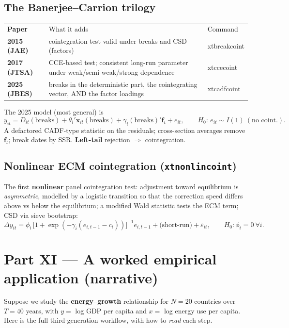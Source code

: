 \documentclass[11pt,a4paper]{article}
\newcommand{\Ito}{I(1)}
\newcommand{\cmd}[1]{\texttt{\textcolor{camber}{#1}}}
\newcommand{\hlt}[2]{\textcolor{#1}{\textbf{#2}}}
\newcommand{\bx}{\mathbf{x}}
\newcommand{\bff}{\mathbf{f}}
\theoremstyle{definition}
\begin{document}
\subsection{The Banerjee--Carrion trilogy}
\begin{center}
\begin{tabular}{@{}>{\bfseries}l p{9.2cm} >{\ttfamily}l@{}}
\rowcolor{cteal}\color{white}Paper & \color{white}What it adds & \color{white}Command\\
2015 (JAE) & cointegration test valid under breaks and CSD (factors) & xtbreakcoint\\
2017 (JTSA) & CCE-based test; consistent long-run parameter under weak/semi-weak/strong dependence & xtccecoint\\
2025 (JBES) & breaks in the deterministic part, the cointegrating vector, AND the factor loadings & xtcadfcoint\\
\end{tabular}
\end{center}
The 2025 model (most general) is
\[
y_{it}=D_{it}(\text{breaks})+\theta_i'\bx_{it}(\text{breaks})+\gamma_i(\text{breaks})'\bff_t+e_{it},
\qquad H_0:\,e_{it}\sim\Ito\ (\text{no coint.}).
\]
A defactored CADF-type statistic on the residuals; cross-section averages remove $\bff_t$; break
dates by SSR. \hlt{cred}{Left-tail} rejection $\Rightarrow$ cointegration.

\subsection{Nonlinear ECM cointegration (\cmd{xtnonlincoint})}
The first \hlt{cgrape}{nonlinear} panel cointegration test: adjustment toward equilibrium is
\emph{asymmetric}, modelled by a logistic transition so that the correction speed differs above vs
below the equilibrium; a modified Wald statistic tests the ECM term; CSD via sieve bootstrap:
\[
\Delta y_{it}=\phi_i\,\big[1+\exp(-\gamma_i(e_{i,t-1}-c_i))\big]^{-1} e_{i,t-1}+\text{(short-run)}+\varepsilon_{it},
\qquad H_0:\phi_i=0\ \forall i.
\]

\section{Part XI --- A worked empirical application (narrative)}

Suppose we study the \hlt{cblue}{energy--growth} relationship for $N=20$ countries over
$T=40$ years, with $y=$ log GDP per capita and $x=$ log energy use per capita. Here is the full
third-generation workflow, with how to \emph{read} each step.
\end{document}
